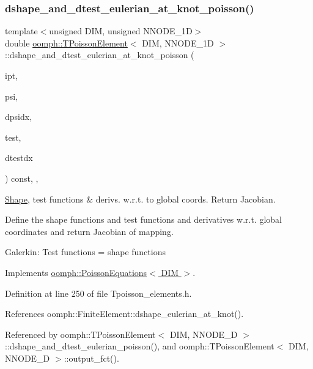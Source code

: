 \subsubsection{\texorpdfstring{dshape\+\_\+and\+\_\+dtest\+\_\+eulerian\+\_\+at\+\_\+knot\+\_\+poisson()}{dshape\_and\_dtest\_eulerian\_at\_knot\_poisson()}\hspace{0.1cm}{\footnotesize\ttfamily [1/2]}}
{\footnotesize\ttfamily template$<$unsigned D\+IM, unsigned N\+N\+O\+D\+E\+\_\+1D$>$ \\
double \hyperlink{classoomph_1_1TPoissonElement}{oomph\+::\+T\+Poisson\+Element}$<$ D\+IM, N\+N\+O\+D\+E\+\_\+1D $>$\+::dshape\+\_\+and\+\_\+dtest\+\_\+eulerian\+\_\+at\+\_\+knot\+\_\+poisson (\begin{DoxyParamCaption}\item[{const unsigned \&}]{ipt,  }\item[{\hyperlink{classoomph_1_1Shape}{Shape} \&}]{psi,  }\item[{\hyperlink{classoomph_1_1DShape}{D\+Shape} \&}]{dpsidx,  }\item[{\hyperlink{classoomph_1_1Shape}{Shape} \&}]{test,  }\item[{\hyperlink{classoomph_1_1DShape}{D\+Shape} \&}]{dtestdx }\end{DoxyParamCaption}) const\hspace{0.3cm}{\ttfamily [inline]}, {\ttfamily [protected]}, {\ttfamily [virtual]}}



\hyperlink{classoomph_1_1Shape}{Shape}, test functions \& derivs. w.\+r.\+t. to global coords. Return Jacobian. 

Define the shape functions and test functions and derivatives w.\+r.\+t. global coordinates and return Jacobian of mapping.

Galerkin\+: Test functions = shape functions 

Implements \hyperlink{classoomph_1_1PoissonEquations_af68ad067d9a9d1bcbcc1ee3094b77a7a}{oomph\+::\+Poisson\+Equations$<$ D\+I\+M $>$}.



Definition at line 250 of file Tpoisson\+\_\+elements.\+h.



References oomph\+::\+Finite\+Element\+::dshape\+\_\+eulerian\+\_\+at\+\_\+knot().



Referenced by oomph\+::\+T\+Poisson\+Element$<$ D\+I\+M, N\+N\+O\+D\+E\+\_\+D $>$\+::dshape\+\_\+and\+\_\+dtest\+\_\+eulerian\+\_\+poisson(), and oomph\+::\+T\+Poisson\+Element$<$ D\+I\+M, N\+N\+O\+D\+E\+\_\+D $>$\+::output\+\_\+fct().


